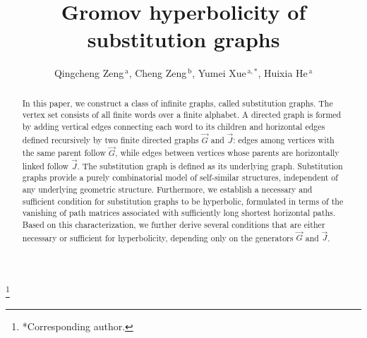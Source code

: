 \documentclass[reqno]{amsart}
\theoremstyle{plain}
\numberwithin{equation}{section}
\begin{document}
\title[Gromov hyperbolicity of substitution graphs]{Gromov hyperbolicity of
substitution graphs}
\author[Qingcheng Zeng, Cheng Zeng, Yumei Xue, Huixia He]{%
    Qingcheng Zeng$^{\,\text{a}}$, 
    Cheng Zeng$^{\,\text{b}}$,     
    Yumei Xue$^{\,\text{a},*}$,    
    Huixia He$^{\,\text{a}}$       
}

\address{\footnotesize\textsuperscript{\textnormal{a}}School of Mathematical Sciences, Beihang University, Beijing
100083, P. R. China}
\address{\footnotesize\textsuperscript{\textnormal{b}}School of Mathematics and Information Science, Shandong Technology
and Business University, Yantai, Shandong Province, 264003, P. R. China}

\thanks{*Corresponding author. }

\begin{abstract}
In this paper, we construct a class of infinite graphs, called substitution
graphs. The vertex set consists of all finite words over a finite alphabet.
A directed graph is formed by adding vertical edges connecting each word to
its children and horizontal edges defined recursively by two finite directed
graphs $\overrightarrow{G}$ and $\overrightarrow{J}$: edges among vertices
with the same parent follow $\overrightarrow{G}$, while edges between
vertices whose parents are horizontally linked follow $\overrightarrow{J}$.
The substitution graph is defined as its underlying graph. Substitution
graphs provide a purely combinatorial model of self-similar structures,
independent of any underlying geometric structure. Furthermore, we establish a necessary
and sufficient condition for substitution graphs to be hyperbolic,
formulated in terms of the vanishing of path matrices associated with
sufficiently long shortest horizontal paths. Based on this characterization,
we further derive several conditions that are either necessary or sufficient
for hyperbolicity, depending only on the generators $\overrightarrow{G}$ and 
$\overrightarrow{J}$.
\end{abstract}
\end{document}
